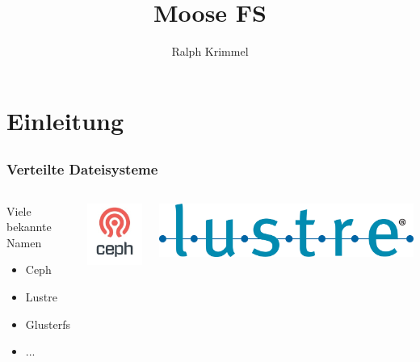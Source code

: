 \documentclass{beamer}
\title{Moose FS}
\author{Ralph Krimmel}
\begin{document}
\section{Einleitung}
\subsection*{}
\begin{frame}
	\maketitle
\end{frame}

\begin{frame}
	\frametitle{Verteilte Dateisysteme}
	\begin{columns}
	\begin{block}{Viele bekannte Namen}
	\begin{itemize}
		\item Ceph
		\item Lustre
		\item Glusterfs
		\item ...
	\end{itemize}
	\end{block}
	\includegraphics[scale=0.22]{ceph.jpg}

	\includegraphics[scale=0.2]{lustre.png}
	

\end{columns}
\end{frame}
\end{document}
